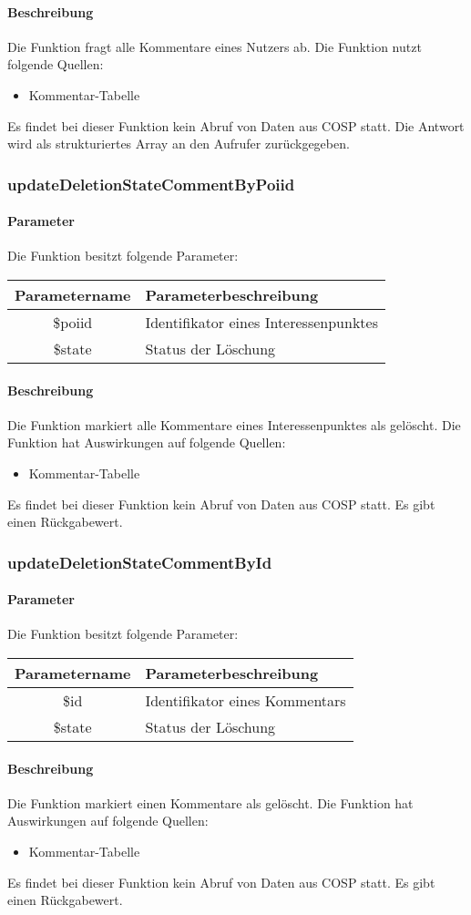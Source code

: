 \paragraph{Beschreibung} Die Funktion fragt alle Kommentare eines Nutzers ab. Die Funktion nutzt folgende Quellen:
\begin{itemize}
	\item Kommentar-Tabelle
\end{itemize}
Es findet bei dieser Funktion kein Abruf von Daten aus {\glqq COSP\grqq} statt. Die Antwort wird als strukturiertes Array an den Aufrufer zurückgegeben.
\subsubsection{updateDeletionStateCommentByPoiid}
\paragraph{Parameter} Die Funktion besitzt folgende Parameter:
\begin{table}[H]
	\begin{tabular}{|c|p{11cm}|}
		\hline
		\textbf{Parametername} & \textbf{Parameterbeschreibung} \\ \hline
		\$poiid & Identifikator eines Interessenpunktes \\ \hline
		\$state & Status der Löschung \\ \hline
	\end{tabular}
\end{table}
\paragraph{Beschreibung} Die Funktion markiert alle Kommentare eines Interessenpunktes als gelöscht. Die Funktion hat Auswirkungen auf folgende Quellen:
\begin{itemize}
	\item Kommentar-Tabelle
\end{itemize}
Es findet bei dieser Funktion kein Abruf von Daten aus {\glqq COSP\grqq} statt. Es gibt einen Rückgabewert.
\subsubsection{updateDeletionStateCommentById}
\paragraph{Parameter} Die Funktion besitzt folgende Parameter:
\begin{table}[H]
	\begin{tabular}{|c|p{11cm}|}
		\hline
		\textbf{Parametername} & \textbf{Parameterbeschreibung} \\ \hline
		\$id    & Identifikator eines Kommentars \\ \hline
		\$state & Status der Löschung \\ \hline
	\end{tabular}
\end{table}
\paragraph{Beschreibung} Die Funktion markiert einen Kommentare als gelöscht. Die Funktion hat Auswirkungen auf folgende Quellen:
\begin{itemize}
	\item Kommentar-Tabelle
\end{itemize}
Es findet bei dieser Funktion kein Abruf von Daten aus {\glqq COSP\grqq} statt. Es gibt einen Rückgabewert.